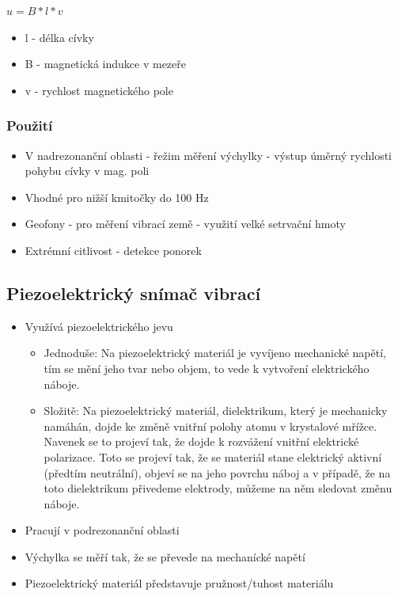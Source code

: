 $u = B*l*v$
\begin{itemize}
    \item l - délka cívky
    \item B - magnetická indukce v mezeře
    \item v - rychlost magnetického pole
\end{itemize}

\subsubsection*{Použití}
\begin{itemize}
    \item V nadrezonanční oblasti - řežim měření výchylky - výstup úměrný rychlosti pohybu cívky v mag. poli
    \item Vhodné pro nižší kmitočky do 100 Hz
    \item Geofony - pro měření vibrací země - využití velké setrvační hmoty
    \item Extrémní citlivost - detekce ponorek
\end{itemize}

\subsection*{Piezoelektrický snímač vibrací}
\begin{itemize}
    \item Využívá piezoelektrického jevu \begin{itemize}
        \item Jednoduše: Na piezoelektrický materiál je vyvíjeno mechanické napětí, tím se mění jeho tvar nebo objem, to vede k vytvoření elektrického náboje.
        \item Složitě: Na piezoelektrický materiál, dielektrikum, který je mechanicky namáhán, dojde ke změně vnitřní polohy atomu v krystalové mřížce. Navenek se to projeví tak, že dojde k rozvážení vnitřní elektrické polarizace. Toto se projeví tak, že se materiál stane elektrický aktivní (předtím neutrální), objeví se na jeho povrchu náboj a v případě, že na toto dielektrikum přivedeme elektrody, můžeme na něm sledovat změnu náboje.
    \end{itemize}
    \item Pracují v podrezonanční oblasti
    \item Výchylka se měří tak, že se převede na mechanícké napětí
    \item Piezoelektrický materiál představuje pružnost/tuhost materiálu
\end{itemize}


